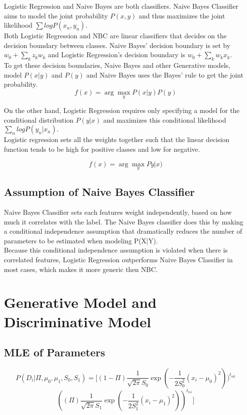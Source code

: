 \documentclass[letter,11pt]{article}
\begin{document}
	\hspace{7mm}Logistic Regression and Naive Bayes are both classifiers. Naive Bayes Classifier aims to model the joint probability $P(x,y)$ and thus maximizes the joint likelihood $\sum log P(x_n,y_n)$.\\
	
	Both Logistic Regression and NBC are linear classifiers that decides on the decision boundary between classes. Naive Bayes' decision boundary is set by $w_0 + \sum_{k}z_kw_k$ and Logistic Regression's decision boundary is $w_0 + \sum_{k}w_kx_k$.\\
	
	
	To get these decision boundaries, Naive Bayes and other Generative models, model $P(x|y)$ and $P(y)$ and Naive Bayes uses the Bayes' rule to get the joint probability.
	$$ f(x) = \arg\max_y P(x|y)P(y)$$
	
	On the other hand, Logistic Regression requires only specifying a model for the conditional distribution $P(y|x)$ and maximizes this conditional likelihood $\sum_{n}logP(y_n|x_n).$\\
	
	Logistic regression sets all the weights together such that the linear decision function tends to be high for positive classes and low for negative.
	
	$$f(x) = \arg\max_y Py|x)$$
	
	\subsection{Assumption of Naive Bayes Classifier}
	
	Naive Bayes Classifier sets each features weight independently, based on how much it correlates with the label. The Naive Bayes classifier does this
	by making a conditional independence assumption that dramatically reduces the
	number of parameters to be estimated when modeling P(X|Y).\\
	
	Because this conditional independence assumption is violated when there is correlated features, Logistic Regression outperforms Naive Bayes Classifier in most cases, which makes it more generic then NBC. 
	
	\section{Generative Model and Discriminative Model}
	\subsection{MLE of Parameters}	
	$$P(D_i|\Pi,\mu_0,\mu_1,S_0,S_1) = [(1-\Pi) \frac{1}{\sqrt{2\pi}S_0}\exp(-\frac{1}{2S_0^2}(x_i-\mu_0)^2))^{t_{n0}}$$$$((\Pi)\frac{1}{\sqrt{2\pi}S_1}\exp(-\frac{1}{2S_1^2}(x_i-\mu_1)^2))^{t_{n1}}]$$
	
\end{document}
